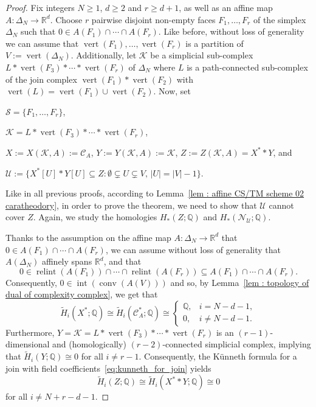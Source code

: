 \documentclass[a4paper,11pt,reqno, english]{amsart}
\theoremstyle{definition}
\theoremstyle{remark}
\newcommand\R{\mathbb R}
\newcommand\Q{\mathbb Q}
\newcommand\NN{\mathscr N}
\newcommand\U{\mathscr U}
\newcommand\CC{\mathscr C}
\DeclareMathOperator{\vertex}{\mathrm{vert}}
\DeclareMathOperator{\interior}{\mathrm{int}}
\DeclareMathOperator{\relint}{\mathrm{relint}}
\DeclareMathOperator{\conv}{\mathrm{conv}}
\begin{document}
\begin{proof}
	Fix integers $N\geq 1$, $d\geq 2$ and $r\geq d+1$, as well as an affine map $A\colon \Delta_N\longrightarrow\R^d$.
	Choose  $r$ pairwise disjoint non-empty faces $F_1,\dots, F_{r}$ of the simplex $\Delta_N$ such that
	$
		0\in A(F_1)\cap\cdots\cap A(F_{r})
	$.
	Like before, without loss of generality we can assume that $\vertex(F_1),\dots ,\vertex(F_{r})$ is a partition of $V:=\vertex(\Delta_N)$.
	Additionally, let $\mathcal{K}$ be a simplicial sub-complex  $L*\vertex(F_3)*\cdots *\vertex(F_r)$ of $\Delta_N$ where $L$ is a path-connected sub-complex of the join complex $\vertex(F_1)*\vertex(F_2)$ with $\vertex(L)=\vertex(F_1)\cup\vertex(F_2)$.
	Now, set
	\begin{compactitem}[\rm \quad --]
		\item $\mathcal{S}=\{F_1,\dots ,F_{r}\}$,
		\item $\mathcal{K}=L*\vertex(F_3)*\cdots *\vertex(F_r)$,
		\item $X:=X(\mathcal{K},A):=\CC_A$, $Y:=Y(\mathcal{K},A):=\mathcal{K}$,   $Z:=Z(\mathcal{K},A)=X^**Y$, and
		\item $\U := \big\{ X^*[U]*Y[U] \subseteq Z : \emptyset\subsetneq U \subsetneq V,\, |U|=|V|-1\big\}$.
	\end{compactitem}
	Like in all previous proofs, according to Lemma~\ref{lem : affine CS/TM scheme 02 caratheodory}, in order to prove the theorem, we need to show that $\U$ cannot cover $Z$.
	Again, we study the homologies $H_{*}(Z;\Q)$ and $H_*(\NN_{\U};\Q)$.

	\medskip
	Thanks to the assumption on the affine map $A\colon \Delta_N\longrightarrow\R^d$ that
	$
		0\in A(F_1)\cap\cdots\cap A(F_{r})
	$, we can assume without loss of generality that $A(\Delta_N)$ affinely spans $\R^d$, and that
	\[
		0\in \relint( A(F_1))\cap\cdots\cap  \relint(A( F_r)) \subseteq A(F_1)\cap\cdots\cap A(F_r).
	\]
	Consequently, $0\in \interior(\conv (A(V)))$ and so, by Lemma~\ref{lem : topology of dual of complexity complex}, we  get that
	\[
		\widetilde{H}_i(X^*;\Q)\cong \widetilde{H}_i(\CC_A^*;\Q) \cong
		\begin{cases}
			\Q, & i= N-d-1 ,    \\
			0,  & i\neq N-d-1 .
		\end{cases}
	\]
	Furthermore, $Y=\mathcal{K}=L*\vertex(F_3)*\cdots *\vertex(F_r)$ is an $(r-1)$-dimensional and (homologically) $(r-2)$-connected simplicial complex, implying that $\widetilde{H}_i(Y;\Q)\cong 0$ for all $i\neq r-1$.
	Consequently, the K\"unneth formula for a join with field coefficients~\eqref{eq:kunneth_for_join} yields
	\begin{equation}\label{eq : homology of Z -- C04}
		\widetilde{H}_i(Z;\Q) \cong \widetilde{H}_i(X^**Y;\Q) \cong 0
	\end{equation}
	for all $i\neq  N+r-d-1$.


\end{proof}
\end{document}
